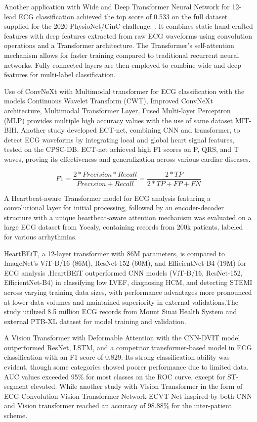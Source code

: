 \documentclass[conference]{IEEEtran}
\begin{document}
Another application with Wide and Deep Transformer Neural Network for 12-lead ECG classification\cite{b16} achieved the top score of 0.533 on the full dataset supplied for the 2020 PhysioNet/CinC challenge. . It combines static hand-crafted features with deep features extracted from raw ECG waveforms using convolution operations and a Transformer architecture. The Transformer's self-attention mechanism allows for faster training compared to traditional recurrent neural networks. Fully connected layers are then employed to combine wide and deep features for multi-label classification.

Use of ConvNeXt with Multimodal transformer\cite{b18} for ECG classification with the models Continuous Wavelet Transform (CWT), Improved ConvNeXt architecture, Multimodal Transformer Layer, Fused Multi-layer Perceptron (MLP) provides multiple high accuracy values with the use of same dataset MIT-BIH. Another study\cite{b20} developed ECT-net, combining CNN and transformer, to detect ECG waveforms by integrating local and global heart signal features, tested on the CPSC-DB. ECT-net achieved high F1 scores on P, QRS, and T waves, proving its effectiveness and generalization across various cardiac diseases.


\begin{equation}
    F1 = \frac{2*Precision*Recall}{Precision+Recall} = \frac{2*TP}{2*TP+FP+FN}
\end{equation}

A Heartbeat-aware Transformer model\cite{b21} for ECG analysis featuring a convolutional layer for initial processing, followed by an encoder-decoder structure with a unique heartbeat-aware attention mechanism was evaluated on a large ECG dataset from Yocaly, containing records from 200k patients, labeled for various arrhythmias. 

HeartBEiT\cite{b22}, a 12-layer transformer with 86M parameters, is compared to ImageNet's ViT-B/16 (86M), ResNet-152 (60M), and EfficientNet-B4 (19M) for ECG analysis .HeartBEiT outperformed CNN models (ViT-B/16, ResNet-152, EfficientNet-B4) in classifying low LVEF, diagnosing HCM, and detecting STEMI across varying training data sizes, with performance advantages more pronounced at lower data volumes and maintained superiority in external validations.The study utilized 8.5 million ECG records from Mount Sinai Health System and external PTB-XL dataset for model training and validation.	

A Vision Transformer with Deformable Attention\cite{b23} with the CNN-DVIT model outperformed ResNet, LSTM, and a competitor transformer-based model in ECG classification with an F1 score of 0.829. Its strong classification ability was evident, though some categories showed poorer performance due to limited data. AUC values exceeded 95\% for most classes on the ROC curve, except for ST-segment elevated. While another study with Vision Transformer in the form of ECG-Convolution-Vision Transformer Network ECVT-Net\cite{b24} inspired by both CNN and Vision transformer reached an accuracy of 98.88\% for the inter-patient scheme.
\end{document}
